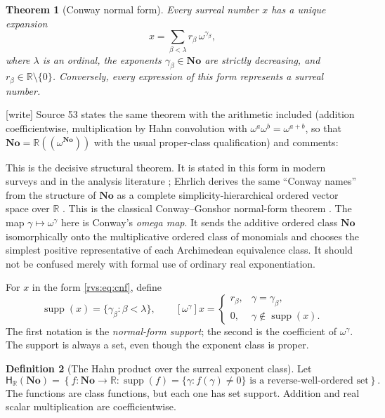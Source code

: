 \documentclass[11pt,letterpaper]{article}
\numberwithin{equation}{section}
\newtheorem{theorem}{Theorem}[section]
\theoremstyle{definition}
\newtheorem{definition}[theorem]{Definition}
\theoremstyle{remark}
\newcommand{\No}{\mathbf{No}}
\newcommand{\R}{\mathbb{R}}
\newcommand{\Hahn}{\mathsf{H}}
\newcommand{\supp}{\operatorname{supp}}
\newcommand{\wtag}{\textup{[write]}}%
\begin{document}
\begin{theorem}[Conway normal form]\label{rvs:thm:cnf}
\label{rvs:cv:thm:CNF}
Every surreal number \(x\) has a unique expansion
\begin{equation}\label{rvs:eq:cnf}
  x=\sum_{\beta<\lambda} r_\beta\,\omega^{\gamma_\beta},
\end{equation}
where \(\lambda\) is an ordinal, the exponents
\(\gamma_\beta\in\No\) are strictly decreasing, and
\(r_\beta\in\R\setminus\{0\}\).  Conversely, every expression of this form
represents a surreal number.
\end{theorem}

\noindent\wtag{} Source 53 states the same theorem with the arithmetic
included (addition coefficientwise, multiplication by Hahn convolution with
\(\omega^a\omega^b=\omega^{a+b}\), so that \(\No=\R((\omega^{\No}))\) with the
usual proper-class qualification) and comments:

This is the decisive structural theorem. It is stated in this form in modern
surveys and in the analysis literature \cite{MantovaMatusinski,CostinEhrlich};
Ehrlich derives the same ``Conway names'' from the structure of $\No$ as a
complete simplicity-hierarchical ordered vector space over $\R$
\cite{Ehrlich2011}.
This is the classical Conway--Gonshor normal-form theorem
\cite{Conway,Gonshor,vdDE,MantovaMatusinski}.  The map
\(\gamma\mapsto\omega^\gamma\) here is Conway's \emph{omega map}.  It sends
the additive ordered class \(\No\) isomorphically onto the multiplicative
ordered class of monomials and chooses the simplest positive representative
of each Archimedean equivalence class.  It should not be confused merely with
formal use of ordinary real exponentiation.

For \(x\) in the form \eqref{rvs:eq:cnf}, define
\[
  \supp(x)=\{\gamma_\beta:\beta<\lambda\},
  \qquad
  [\omega^\gamma]x=
  \begin{cases}
  r_\beta,&\gamma=\gamma_\beta,\\
  0,&\gamma\notin\supp(x).
  \end{cases}
\]
The first notation is the \emph{normal-form support}; the second is the
coefficient of \(\omega^\gamma\).  The support is always a set, even though
the exponent class is proper.

\begin{definition}[The Hahn product over the surreal exponent class]
Let
\begin{equation}\label{rvs:eq:hahn-product}
 \Hahn_{\R}(\No)=
 \left\{f:\No\to\R:
 \supp(f)=\{\gamma:f(\gamma)\ne0\}
 \text{ is a reverse-well-ordered set}\right\}.
\end{equation}
The functions are class functions, but each one has set support.  Addition and
real scalar multiplication are coefficientwise.
\end{definition}
\end{document}

